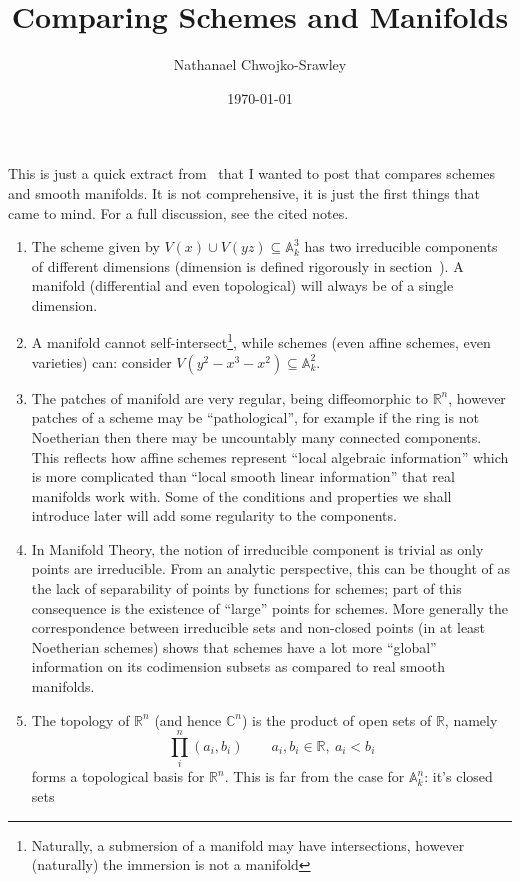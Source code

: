 \documentclass{article}
\title{Comparing Schemes and Manifolds}
\author{Nathanael Chwojko-Srawley}
\date{\today}
\renewcommand{\maketitle}{
    \quad
    \vspace{1em}
  \begin{center}
      \LARGE\bfseries \thetitle \par
      \vspace{0.6em}
      \large
  \end{center}
    \vspace{1em}
}
\newcommand{\A}{{\mathbb{A}}}
\newcommand{\C}{{\mathbb{C}}}
\newcommand{\R}{{\mathbb{R}}}
\newcommand{\sse}{\subseteq}
\begin{document}
\maketitle

This is just a quick extract from~\cite{NateAlgGeo} that I wanted to post that compares schemes and smooth
manifolds. It is not comprehensive, it is just the first things that came to mind. For a full discussion, see the cited notes.

\begin{enumerate}
	\item The scheme given by $V(x)\cup V(yz) \sse \A_k^3$ has two irreducible components of different
		dimensions (dimension is defined rigorously in section~\cite[dimension]{NateAlgGeo}). A manifold (differential
		and even topological) will always be of a single dimension.
	\item A manifold cannot self-intersect\footnote{Naturally, a submersion of a manifold may have
			intersections, however (naturally) the immersion is not a manifold}, while schemes (even affine
			schemes, even varieties) can: consider $V(y^2-x^3-x^2) \sse \A_k^2$.
	\item The patches of manifold are very regular, being diffeomorphic to $\R^n$, however patches of a scheme
		may be ``pathological'', for example if the ring is not Noetherian then there may be uncountably many
		connected components. This reflects how affine schemes represent ``local algebraic information'' which
		is more complicated than ``local smooth linear information'' that real manifolds work with. Some of
		the conditions and properties we shall introduce later will add some regularity to the components.
	\item In Manifold Theory, the notion of irreducible component is trivial as only points are irreducible.
		From an analytic perspective, this can be thought of as the lack of separability of points by
		functions for schemes; part of this consequence is the existence of ``large'' points for schemes. More
		generally the correspondence between irreducible sets and non-closed points (in at least Noetherian schemes)
		shows that schemes have a lot more ``global'' information on its codimension subsets as compared to
		real smooth manifolds.
		\item The topology of $\R^n$ (and hence $\C^n$) is the product of open sets of $\R$, namely
			\[
				\prod_i^n  (a_i, b_i) \qquad a_i, b_i \in \R,\ a_i < b_i
			\]
			forms a topological basis for $\R^n$. This is far from the case for $\A_k^n$: it's closed sets

\end{enumerate}
\end{document}

